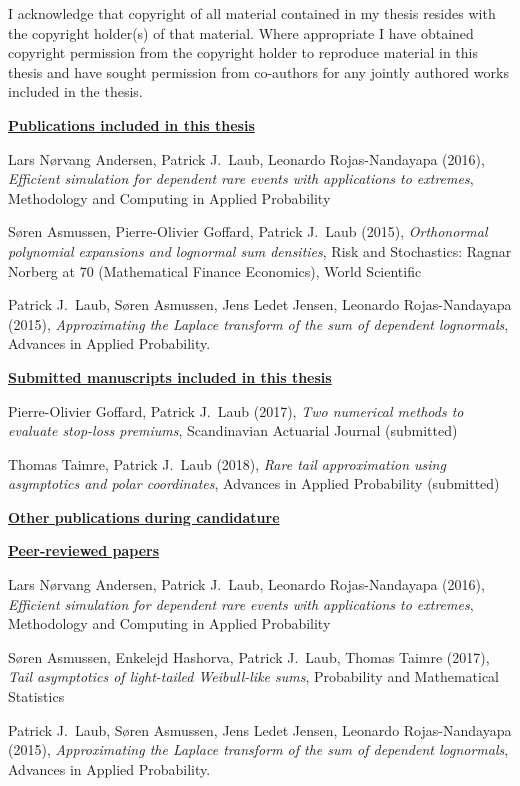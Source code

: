 I acknowledge that copyright of all material contained in my thesis resides with
the copyright holder(s) of that material. Where appropriate I have obtained
copyright permission from the copyright holder to reproduce material in this
thesis and have sought permission from co-authors for any jointly authored works
included in the thesis.


\newpage
{\bf \underline{Publications included in this thesis}}

Lars N{\o}rvang Andersen, Patrick J.\ Laub, Leonardo Rojas-Nandayapa (2016), \emph{Efficient simulation for dependent rare events with applications to extremes}, Methodology and Computing in Applied Probability

S{\o}ren Asmussen, Pierre-Olivier Goffard, Patrick J.\ Laub (2015), \emph{Orthonormal polynomial expansions and lognormal sum densities}, Risk and Stochastics: Ragnar Norberg at 70 (Mathematical Finance Economics), World Scientific

Patrick J.\ Laub, S{\o}ren Asmussen, Jens Ledet Jensen, Leonardo Rojas-Nandayapa (2015), \emph{Approximating the Laplace transform of the sum of dependent lognormals}, Advances in Applied Probability.

\newpage
{\bf \underline{Submitted manuscripts included in this thesis}}

Pierre-Olivier Goffard, Patrick J.\ Laub (2017), \emph{Two numerical methods to evaluate stop-loss premiums}, Scandinavian Actuarial Journal (submitted)

Thomas Taimre, Patrick J.\ Laub (2018), \emph{Rare tail approximation using asymptotics and polar coordinates}, Advances in Applied Probability (submitted)

{\bf \underline{Other publications during candidature}}

{\small \bf \underline{Peer-reviewed papers}}

Lars N{\o}rvang Andersen, Patrick J.\ Laub, Leonardo Rojas-Nandayapa (2016), \emph{Efficient simulation for dependent rare events with applications to extremes}, Methodology and Computing in Applied Probability

S{\o}ren Asmussen, Enkelejd Hashorva, Patrick J.\ Laub, Thomas Taimre (2017), \emph{Tail asymptotics of light-tailed Weibull-like sums}, Probability and Mathematical Statistics

Patrick J.\ Laub, S{\o}ren Asmussen, Jens Ledet Jensen, Leonardo Rojas-Nandayapa (2015), \emph{Approximating the Laplace transform of the sum of dependent lognormals}, Advances in Applied Probability.

